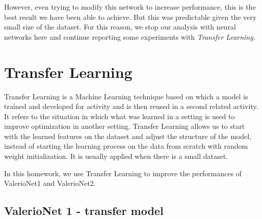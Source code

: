 \documentclass[12pt]{article}
\begin{document}
However, even trying to modify this network to increase performance, this is the best result we have been able to achieve. But this was predictable given the very small size of the dataset. For this reason, we stop our analysis with neural networks here and continue reporting some experiments with {\em Transfer Learning}.

\newpage
\section{Transfer Learning}
Transfer Learning is a Machine Learning technique based on which a model is trained and developed for activity and is then reused in a second related activity. It refers to the situation in which what was learned in a setting is used to improve optimization in another setting. Transfer Learning allows us to start with the learned features on the dataset and adjust the structure of the model, instead of starting the learning process on the data from scratch with random weight initialization. It is usually applied when there is a small dataset.

In this homework, we use Transfer Learning to improve the performances of ValerioNet1 and ValerioNet2.

\subsection{ValerioNet 1 - transfer model}
\end{document}
